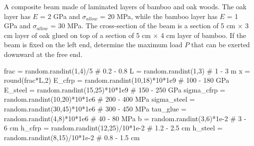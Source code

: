 \documentclass[
fontsize=10pt,
a4paper,
twosides=false,
open=any,
svgnames,
]{kaobook} %
\begin{document}
\begin{exercises}
\item A composite beam made of laminated layers of bamboo and oak woods. The oak layer has $E$ = 2 GPa and $\sigma_{allow}$ = 20 MPa, while the bamboo layer has $E$ = 1 GPa and $\sigma_{allow}$ = 30 MPa. The cross-section of the beam is a section of 5 cm $\times$ 3 cm layer of oak glued on top of a section of 5 cm $\times$ 4 cm layer of bamboo. If the beam is fixed on the left end, determine the maximum load $P$ that can be exerted downward at the free end.

  \begin{figure}[h]
    \centering
  \end{figure}

\begin{pycode}
  frac = random.randint(1,4)/5 # 0.2 - 0.8
  L = random.randint(1,3) # 1 - 3 m
  x = round(frac*L,2)
  E_cfrp = random.randint(10,18)*10*1e9 # 100 - 180 GPa
  E_steel = random.randint(15,25)*10*1e9 # 150 - 250 GPa
  sigma_cfrp = random.randint(10,20)*10*1e6 # 200 - 400 MPa
  sigma_steel = random.randint(30,45)*10*1e6 # 300 - 450 MPa
  tau_glue = random.randint(4,8)*10*1e6 # 40 - 80 MPa
  b = random.randint(3,6)*1e-2 # 3 - 6 cm
  h_cfrp =  random.randint(12,25)/10*1e-2 # 1.2 - 2.5 cm
  h_steel =  random.randint(8,15)/10*1e-2 # 0.8 - 1.5 cm
\end{pycode}


\end{exercises}
\end{document}
